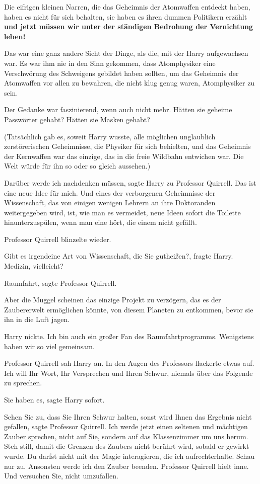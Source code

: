 Die eifrigen kleinen Narren, die das Geheimnis der Atomwaffen entdeckt haben,
haben es nicht für sich behalten, sie haben es ihren dummen Politikern erzählt
\textbf{und jetzt müssen wir unter der ständigen Bedrohung der Vernichtung
leben!}\grqq{}

Das war eine ganz andere Sicht der Dinge, als die, mit der Harry aufgewachsen
war. Es war ihm nie in den Sinn gekommen, dass Atomphysiker eine Verschwörung
des Schweigens gebildet haben sollten, um das Geheimnis der Atomwaffen vor allen
zu bewahren, die nicht klug genug waren, Atomphysiker zu sein.

Der Gedanke war faszinierend, wenn auch nicht mehr. Hätten sie geheime
Passwörter gehabt? Hätten sie Masken gehabt?

(Tatsächlich gab es, soweit Harry wusste, alle möglichen unglaublich
zerstörerischen Geheimnisse, die Physiker für sich behielten, und das Geheimnis
der Kernwaffen war das einzige, das in die freie Wildbahn entwichen war. Die
Welt würde für ihn so oder so gleich aussehen.)

\glqq Darüber werde ich nachdenken müssen\grqq{}, sagte Harry zu Professor
Quirrell. \glqq Das ist eine neue Idee für mich. Und eines der verborgenen
Geheimnisse der Wissenschaft, das von einigen wenigen Lehrern an ihre
Doktoranden weitergegeben wird, ist, wie man es vermeidet, neue Ideen sofort die
Toilette hinunterzuspülen, wenn man eine hört, die einem nicht gefällt.\grqq{}

Professor Quirrell blinzelte wieder.

\glqq Gibt es irgendeine Art von Wissenschaft, die Sie gutheißen?\grqq{},
fragte Harry. \glqq Medizin, vielleicht?\grqq{}

\glqq Raumfahrt\grqq{}, sagte Professor Quirrell.

\glqq Aber die Muggel scheinen das einzige Projekt zu verzögern, das es der
Zaubererwelt ermöglichen könnte, von diesem Planeten zu entkommen, bevor sie ihn
in die Luft jagen.\grqq{}

Harry nickte. \glqq Ich bin auch ein großer Fan des Raumfahrtprogramms.
Wenigstens haben wir so viel gemeinsam.\grqq{}

Professor Quirrell sah Harry an. In den Augen des Professors flackerte etwas
auf. \glqq Ich will Ihr Wort, Ihr Versprechen und Ihren Schwur, niemals über das
Folgende zu sprechen.\grqq{}

\glqq Sie haben es\grqq{}, sagte Harry sofort.

\glqq Sehen Sie zu, dass Sie Ihren Schwur halten, sonst wird Ihnen das Ergebnis
nicht gefallen\grqq{}, sagte Professor Quirrell. \glqq Ich werde jetzt einen
seltenen und mächtigen Zauber sprechen, nicht auf Sie, sondern auf das
Klassenzimmer um uns herum. Steh still, damit die Grenzen des Zaubers nicht
berührt wird, sobald er gewirkt wurde. Du darfst nicht mit der Magie
interagieren, die ich aufrechterhalte. Schau nur zu. Ansonsten werde ich den
Zauber beenden.\grqq{} Professor Quirrell hielt inne. \glqq Und versuchen Sie,
nicht umzufallen.\grqq{}

